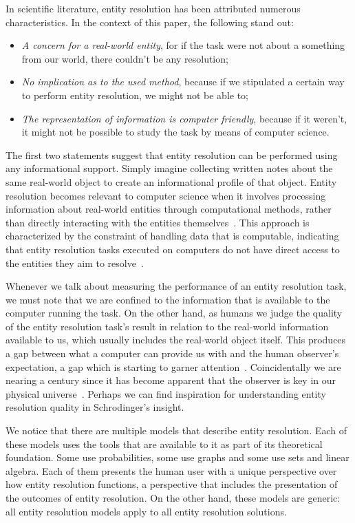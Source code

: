 In scientific literature, entity resolution has been attributed numerous
characteristics\cite{Tal11,Pap19}.
In the context of this paper, the following stand out:

\begin{itemize}
    \item\textit{A concern for a real-world entity}, for if the task were
    not about a something from our world, there couldn't be any resolution;
    \item\textit{No implication as to the used method}, because if we
    stipulated a certain way to perform entity resolution, we might not be
    able to;
    \item\textit{The representation of information is computer friendly},
    because if it weren't, it might not be possible to study the task by
    means of computer science.
\end{itemize}

The first two statements suggest that entity resolution can be performed
using any informational support.
Simply imagine collecting written notes about the same real-world object to
create an informational profile of that object.
Entity resolution becomes relevant to computer science when it involves
processing information about real-world entities through computational
methods, rather than directly interacting with the entities
themselves~\cite{Tal11}.
This approach is characterized by the constraint of handling data that is
computable, indicating that entity resolution tasks executed on computers
do not have direct access to the entities they aim to resolve~\cite{Chen09}.

Whenever we talk about measuring the performance of an entity resolution
task, we must note that we are confined to the information that is available
to the computer running the task.
On the other hand, as humans we judge the quality of the entity resolution
task's result in relation to the real-world information available to us, which
usually includes the real-world object itself.
This produces a gap between what a computer can provide us with and the human
observer's expectation, a gap which is starting to garner attention~\cite{wang2022realideal}.
Coincidentally we are nearing a century since it has become apparent that the
observer is key in our physical universe~\cite{schrodinger1926}.
Perhaps we can find inspiration for understanding entity resolution quality in
Schrodinger's insight.

We notice that there are multiple models that describe entity resolution.
Each of these models uses the tools that are available to it as part of its
theoretical foundation.
Some use probabilities, some use graphs and some use sets and linear algebra.
Each of them presents the human user with a unique perspective over how entity
resolution functions, a perspective that includes the presentation of the
outcomes of entity resolution.
On the other hand, these models are generic: all entity resolution models apply
to all entity resolution solutions.

